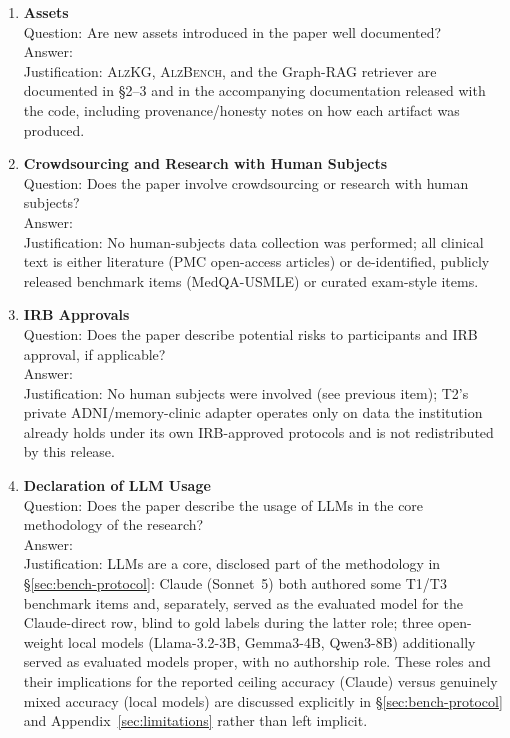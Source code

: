 \documentclass{article}
\begin{document}
\begin{enumerate}
\item \textbf{Assets}\\
    Question: Are new assets introduced in the paper well documented?\\
    Answer: \answerYes{}\\
    Justification: \textsc{AlzKG}, \textsc{AlzBench}, and the Graph-RAG retriever are documented in \S2--3 and in the accompanying documentation released with the code, including provenance/honesty notes on how each artifact was produced.

\item \textbf{Crowdsourcing and Research with Human Subjects}\\
    Question: Does the paper involve crowdsourcing or research with human subjects?\\
    Answer: \answerNA{}\\
    Justification: No human-subjects data collection was performed; all clinical text is either literature (PMC open-access articles) or de-identified, publicly released benchmark items (MedQA-USMLE) or curated exam-style items.

\item \textbf{IRB Approvals}\\
    Question: Does the paper describe potential risks to participants and IRB approval, if applicable?\\
    Answer: \answerNA{}\\
    Justification: No human subjects were involved (see previous item); T2's private ADNI/memory-clinic adapter operates only on data the institution already holds under its own IRB-approved protocols and is not redistributed by this release.

\item \textbf{Declaration of LLM Usage}\\
    Question: Does the paper describe the usage of LLMs in the core methodology of the research?\\
    Answer: \answerYes{}\\
    Justification: LLMs are a core, disclosed part of the methodology in \S\ref{sec:bench-protocol}: Claude (Sonnet~5) both authored some T1/T3 benchmark items and, separately, served as the evaluated model for the Claude-direct row, blind to gold labels during the latter role; three open-weight local models (Llama-3.2-3B, Gemma3-4B, Qwen3-8B) additionally served as evaluated models proper, with no authorship role. These roles and their implications for the reported ceiling accuracy (Claude) versus genuinely mixed accuracy (local models) are discussed explicitly in \S\ref{sec:bench-protocol} and Appendix~\ref{sec:limitations} rather than left implicit.

\end{enumerate}
\end{document}
